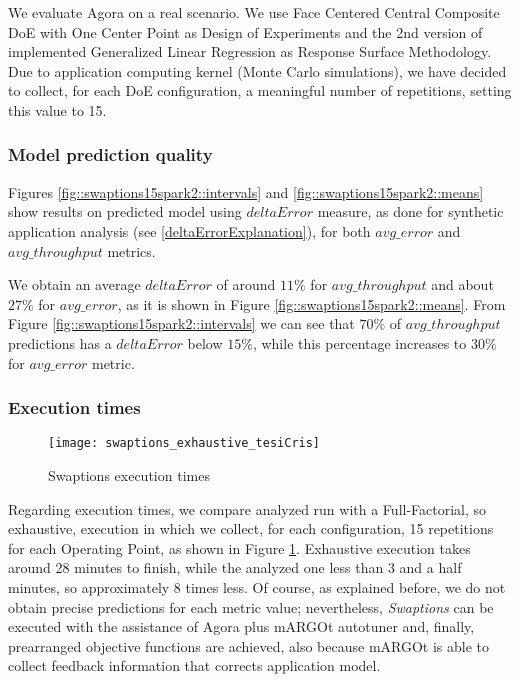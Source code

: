 We evaluate Agora on a real scenario. We use Face Centered Central Composite DoE with One Center Point as Design of Experiments and the 2nd version of implemented Generalized Linear Regression as Response Surface Methodology. Due to application computing kernel (Monte Carlo simulations), we have decided to collect, for each DoE configuration, a meaningful number of repetitions, setting this value to 15.


\subsubsection{Model prediction quality}

Figures \ref{fig::swaptions15spark2::intervals} and \ref{fig::swaptions15spark2::means} show results on predicted model using $deltaError$ measure, as done for synthetic application analysis (see \ref{deltaErrorExplanation}), for both $avg\_error$ and $avg\_throughput$ metrics.

We obtain an average $deltaError$ of around $11\%$ for $avg\_throughput$ and about $27\%$ for $avg\_error$, as it is shown in Figure \ref{fig::swaptions15spark2::means}. From Figure \ref{fig::swaptions15spark2::intervals} we can see that $70\%$ of $avg\_throughput$ predictions has a $deltaError$ below $15\%$, while this percentage increases to $30\%$ for $avg\_error$ metric.


\subsubsection{Execution times}

\begin{figure}[htb]

    \centering
    
    \texttt{[image: swaptions\_exhaustive\_tesiCris]}
    
    \caption{Swaptions execution times}
    
    \label{fig::sw::execT}
    
\end{figure}

Regarding execution times, we compare analyzed run with a Full-Factorial, so exhaustive, execution in which we collect, for each configuration, 15 repetitions for each Operating Point, as shown in Figure \ref{fig::sw::execT}. Exhaustive execution takes around 28 minutes to finish, while the analyzed one less than 3 and a half minutes, so approximately 8 times less. Of course, as explained before, we do not obtain precise predictions for each metric value; nevertheless, \textit{Swaptions} can be executed with the assistance of Agora plus mARGOt autotuner and, finally, prearranged objective functions are achieved, also because mARGOt is able to collect feedback information that corrects application model.


